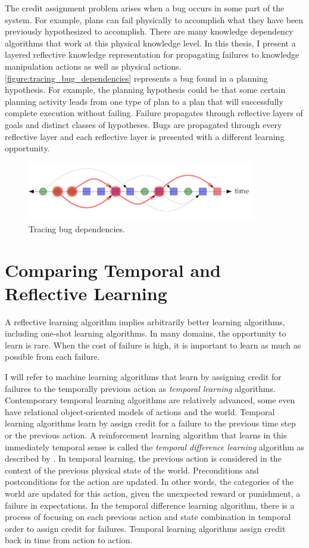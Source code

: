 The credit assignment problem arises when a bug occurs in some part of
the system.  For example, plans can fail physically to accomplish what
they have been previously hypothesized to accomplish.  There are many
knowledge dependency algorithms that work at this physical knowledge
level.  In this thesis, I present a layered reflective knowledge
representation for propagating failures to knowledge manipulation
actions as well as physical actions.
{\mbox{\autoref{figure:tracing_bug_dependencies}}} represents a bug
found in a planning hypothesis.  For example, the planning hypothesis
could be that some certain planning activity leads from one type of
plan to a plan that will successfully complete execution without
failing.  Failure propagates through reflective layers of goals and
distinct classes of hypotheses.  Bugs are propagated through every
reflective layer and each reflective layer is presented with a
different learning opportunity.
\begin{figure}
\center
\includegraphics[width=10cm]{gfx/tracing_bug_dependencies}
\caption{Tracing bug dependencies.}
\label{figure:tracing_bug_dependencies}
\end{figure}

\section{Comparing Temporal and Reflective Learning}

A reflective learning algorithm implies arbitrarily better learning
algorithms, including one-shot learning algorithms.  In many domains,
the opportunity to learn is rare.  When the cost of failure is high,
it is important to learn as much as possible from each failure.

I will refer to machine learning algorithms that learn by assigning
credit for failures to the temporally previous action as
\emph{temporal learning} algorithms.  Contemporary temporal learning
algorithms are relatively advanced, some even have relational
object-oriented models of actions and the world.  Temporal learning
algorithms learn by assign credit for a failure to the previous time
step or the previous action.  A reinforcement learning algorithm that
learns in this immediately temporal sense is called the \emph{temporal
  difference learning} algorithm as described by
\cite*{kaelbling:1996}.  In temporal learning, the previous action is
considered in the context of the previous physical state of the world.
Preconditions and postconditions for the action are updated.  In other
words, the categories of the world are updated for this action, given
the unexpected reward or punishment, a failure in expectations.  In
the temporal difference learning algorithm, there is a process of
focusing on each previous action and state combination in temporal
order to assign credit for failures.  Temporal learning algorithms
assign credit back in time from action to action.

